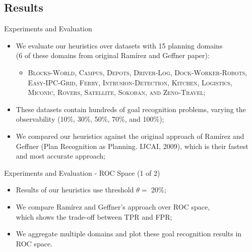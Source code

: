 \documentclass{beamer}
\begin{document}
\subsection{Results}

    \begin{frame}{Experiments and Evaluation}
       	\begin{itemize}
       		\item We evaluate our heuristics over datasets with 15 planning domains \\(6 of these domains from original Ramírez and Geffner paper):
			\begin{itemize}
				\item {\footnotesize \textsc{Blocks-World, Campus, Depots, Driver-Log, Dock-Worker-Robots, Easy-IPC-Grid, Ferry, Intrusion-Detection, Kitchen, Logistics, Miconic, Rovers, Satellite, Sokoban, and Zeno-Travel}}; 
			\end{itemize}
			\item These datasets contain hundreds of goal recognition problems, varying the observability (10\%, 30\%, 50\%, 70\%, and 100\%);
			\item We compared our heuristics against the original approach of Ramírez and Geffner ({\footnotesize Plan Recognition as Planning. IJCAI, 2009}), which is their fastest and most accurate approach;
		\end{itemize}
    \end{frame}


    \begin{frame}{Experiments and Evaluation - ROC Space (1 of 2)}
       	\begin{itemize}
       		\item Results of our heuristics use threshold $\theta = $ 20\%;
			\item We compare Ramírez and Geffner's approach over ROC space,\\
			which shows the trade-off between TPR and FPR;
			\item We aggregate multiple domains and plot these goal recognition results in ROC space.
		\end{itemize}
	\end{frame}

\end{document}
